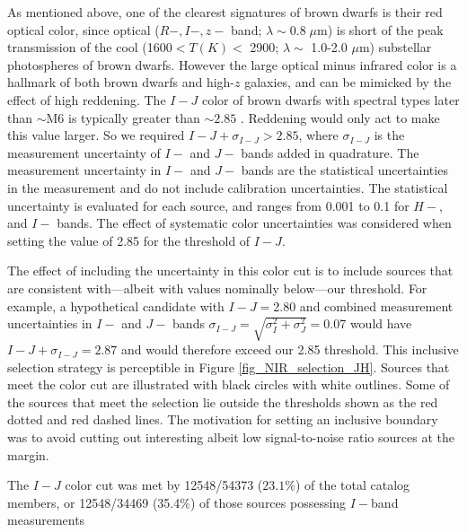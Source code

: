 As mentioned above, one of the clearest signatures of brown dwarfs is their red optical color, since optical  ($R-,I-, z-$ band; $\lambda \sim  0.8 \; \mu$m) is short of the peak transmission of the cool (1600$< T(K) <$ 2900; $\lambda \sim$ 1.0-2.0 $\mu$m) substellar photospheres of brown dwarfs.  However the large optical minus infrared color is a hallmark of both brown dwarfs and high-$z$ galaxies, and can be mimicked by the effect of high reddening.  The $I-J$ color of brown dwarfs with spectral types later than $\sim$M6 is typically greater than $\sim2.85$ \citep{allers06}.  Reddening would only act to make this value larger.  So we required $I-J +\sigma_{I-J} > 2.85$, where $\sigma_{I-J}$ is the measurement uncertainty of $I-$ and $J-$ bands added in quadrature.  The measurement uncertainty in $I-$ and $J-$ bands are the statistical uncertainties in the measurement and do not include calibration uncertainties.  The statistical uncertainty is evaluated for each source, and ranges from 0.001 to 0.1 for $H-$, and $I-$ bands.  The effect of systematic color uncertainties was considered when setting the value of 2.85 for the threshold of $I-J$.

The effect of including the uncertainty in this color cut is to include sources that are consistent with---albeit with values nominally below---our threshold.  For example, a hypothetical candidate with $I-J=$2.80 and combined measurement uncertainties in $I-$ and $J-$ bands $\sigma_{I-J} = \sqrt{\sigma^2_{I}+\sigma^2_{J}}=$0.07 would have $I-J + \sigma_{I-J} = 2.87$ and would therefore exceed our 2.85 threshold.  This inclusive selection strategy is perceptible in Figure \ref{fig_NIR_selection_JH}.  Sources that meet the color cut are illustrated with black circles with white outlines.  Some of the sources that meet the selection lie outside the thresholds shown as the red dotted and red dashed lines.  The motivation for setting an inclusive boundary was to avoid cutting out interesting albeit low signal-to-noise ratio sources at the margin.

The $I-J$ color cut was met by 12548/54373 ($23.1\%$) of the total catalog members, or 12548/34469 (35.4\%) of those sources possessing $I-$band measurements

